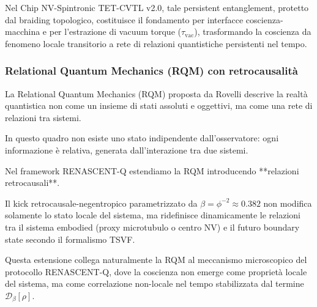 \documentclass[11pt,a4paper]{article}
\let\oldcite\cite
\renewcommand{\cite}{\protect\oldcite}
\theoremstyle{plain}
\theoremstyle{definition}
\begin{document}
Nel Chip NV-Spintronic TET-CVTL v2.0, tale persistent entanglement, protetto dal braiding topologico, costituisce il fondamento per interfacce coscienza-macchina e per l’estrazione di vacuum torque ($\tau_{\text{vac}}$), trasformando la coscienza da fenomeno locale transitorio a rete di relazioni quantistiche persistenti nel tempo.




\vspace{0.7cm}




\subsubsection{Relational Quantum Mechanics (RQM) con retrocausalità}

\vspace{0.2cm}

La Relational Quantum Mechanics (RQM) proposta da Rovelli \cite{rovelli_relational_1996} descrive la realtà quantistica non come un insieme di stati assoluti e oggettivi, ma come una rete di relazioni tra sistemi. 


\vspace{0.2cm}


In questo quadro non esiste uno stato indipendente dall’osservatore: ogni informazione è relativa, generata dall’interazione tra due sistemi. 


\vspace{0.4cm}

Nel framework RENASCENT-Q estendiamo la RQM introducendo **relazioni retrocausali**. 

\vspace{0.2cm}

Il kick retrocausale-negentropico parametrizzato da $\beta = \phi^{-2} \approx 0.382$ non modifica solamente lo stato locale del sistema, ma ridefinisce dinamicamente le relazioni tra il sistema embodied (proxy microtubulo o centro NV) e il futuro boundary state secondo il formalismo TSVF. 


\vspace{0.4cm}


Questa estensione collega naturalmente la RQM al meccanismo microscopico del protocollo RENASCENT-Q, dove la coscienza non emerge come proprietà locale del sistema, ma come correlazione non-locale nel tempo stabilizzata dal termine $\mathcal{D}_\beta[\rho]$.

\vspace{0.3cm}
\end{document}
